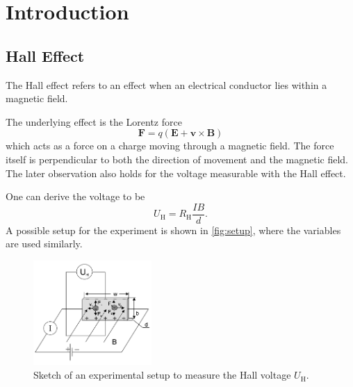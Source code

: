 \section{Introduction}
\label{sec:introduction}

\subsection{Hall Effect}
\label{sec:intr:hall}
The Hall effect refers to an effect when an electrical conductor lies within a magnetic field. 

The underlying effect is the Lorentz force
\[
  \mathbf F = q (\mathbf E + \mathbf v \times \mathbf B)
\]
which acts as a force on a charge moving through a magnetic field. The force itself is perpendicular
to both the direction of movement and the magnetic field. The later observation also holds for the
voltage measurable with the Hall effect.

One can derive the voltage to be 
\begin{equation}
  U_\text{H} = R_\text{H} \frac{I B}{d}.
  \label{eqn:intr:U_H}
\end{equation}
A possible setup for the experiment is shown in \autoref{fig:setup}, where the variables are used
similarly. 
\begin{figure}
  \centering
  \includegraphics[width=0.4\textwidth]{media/setup_sketch.png}
  \caption{Sketch of an experimental setup to measure the Hall voltage $U_\text{H}$.}
  \label{fig:setup}
\end{figure}

